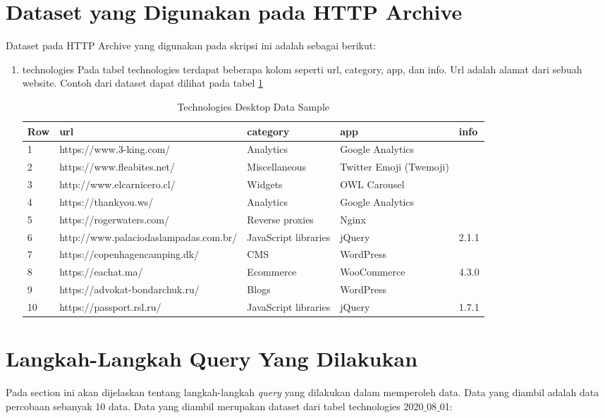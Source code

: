 \section{Dataset yang Digunakan pada HTTP Archive}
Dataset pada HTTP Archive yang digunakan pada skripsi ini adalah sebagai berikut:
\begin{enumerate}
	\item technologies
	Pada tabel technologies terdapat beberapa kolom seperti url, category, app, dan info. Url adalah alamat dari sebuah website. Contoh dari dataset dapat dilihat pada tabel \ref{table:ct_tech_desktop} 
	\begin{table}[H]
		\centering
		\begin{tabular}{|l|l|p{3cm}|p{3cm}|l|}
			\hline
			\textbf{Row} & \textbf{url} & \textbf{category} & app & info\\
			\hline
			1 & https://www.3-king.com/ & Analytics & Google Analytics & \\
			\hline
			2 & https://www.fleabites.net/ & Miscellaneous & Twitter Emoji (Twemoji) & \\
			\hline
			3 & http://www.elcarnicero.cl/ & Widgets & OWL Carousel & \\
			\hline
			4 & https://thankyou.ws/ & Analytics & Google Analytics & \\
			\hline
			5 & https://rogerwaters.com/ & Reverse proxies & Nginx & \\
			\hline
			6 & http://www.palaciodaslampadas.com.br/ & JavaScript libraries & jQuery & 2.1.1\\
			\hline
			7 & https://copenhagencamping.dk/ & CMS & WordPress & \\
			\hline
			8 & https://eachat.ma/ & Ecommerce & WooCommerce & 4.3.0\\
			\hline
			9 & https://advokat-bondarchuk.ru/ & Blogs & WordPress & \\
			\hline
			10 & https://passport.rsl.ru/ & JavaScript libraries & jQuery & 1.7.1\\
			\hline
		\end{tabular}
		\caption{Technologies Desktop Data Sample}
		\label{table:ct_tech_desktop}
	\end{table}
\end{enumerate}

\section{Langkah-Langkah Query Yang Dilakukan}
\label{langkah_query}
Pada section ini akan dijelaskan tentang langkah-langkah \textit{query} yang dilakukan dalam memperoleh data. Data yang diambil adalah data percobaan sebanyak 10 data. Data yang diambil merupakan dataset dari tabel technologies 2020$\_$08$\_$01:

